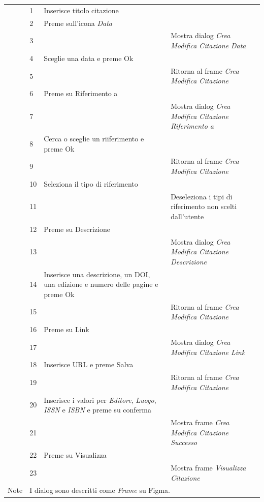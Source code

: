 \begin{table}[H]
\begin{tabularx}{\linewidth}{|l|X|X|X|}
  \cline{2-4} & 1 & Inserisce titolo citazione & \\
  \cline{2-4} & 2 & Preme sull'icona \textit{Data} & \\
  \cline{2-4} & 3 & & Mostra dialog \textit{Crea Modifica Citazione Data}\\
  \cline{2-4} & 4 & Sceglie una data e preme Ok & \\
  \cline{2-4} & 5 & & Ritorna al frame \textit{Crea Modifica Citazione} \\
  \cline{2-4} & 6 & Preme su Riferimento a & \\
  \cline{2-4} & 7 & & Mostra dialog \textit{Crea Modifica Citazione Riferimento a} \\
  \cline{2-4} & 8 & Cerca o sceglie un riiferimento e preme Ok & \\
  \cline{2-4} & 9 & & Ritorna al frame \textit{Crea Modifica Citazione} \\
  \cline{2-4} & 10 & Seleziona il tipo di riferimento & \\
  \cline{2-4} & 11 & & Deseleziona i tipi di riferimento non scelti dall'utente \\
  \cline{2-4} & 12 & Preme su Descrizione & \\
  \cline{2-4} & 13 & & Mostra dialog \textit{Crea Modifica Citazione Descrizione}\\
  \cline{2-4} & 14 & Inserisce una descrizione, un DOI, una edizione e numero delle pagine e preme Ok& \\
  \cline{2-4} & 15 & & Ritorna al frame \textit{Crea Modifica Citazione} \\
  \cline{2-4} & 16 & Preme su Link & \\
  \cline{2-4} & 17 & & Mostra dialog \textit{Crea Modifica Citazione Link} \\
  \cline{2-4} & 18 & Inserisce URL e preme Salva & \\
  \cline{2-4} & 19 & & Ritorna al frame \textit{Crea Modifica Citazione} \\
  \cline{2-4} & 20 & Inserisce i valori per \textit{Editore}, \textit{Luogo}, \textit{ISSN} e \textit{ISBN} e preme su conferma & \\
  \cline{2-4} & 21 & & Mostra frame \textit{Crea Modifica Citazione Successo} \\
  \cline{2-4} & 22 & Preme su Visualizza & \\
  \cline{2-4} & 23 & & Mostra frame \textit{Visualizza Citazione} \\
   \hline Note & \multicolumn{3}{l|}{I dialog sono descritti come \textit{Frame} su Figma.} \\
   \hline

  \end{tabularx}
  \end{table}
  
